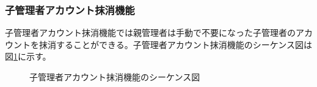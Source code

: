 \documentclass[a4j]{jarticle}
\begin{document}
  \subsubsection{子管理者アカウント抹消機能}
  子管理者アカウント抹消機能では親管理者は手動で不要になった子管理者のアカウントを抹消することができる。子管理者アカウント抹消機能のシーケンス図は図\ref{fig:admin_children-delete.png}に示す。
  \begin{figure}[H]
    \centering
    \caption{子管理者アカウント抹消機能のシーケンス図}
    \label{fig:admin_children-delete.png}
  \end{figure}
\end{document}
